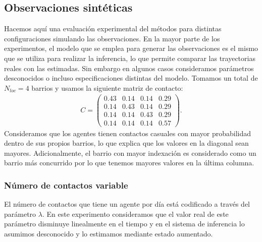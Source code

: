 \subsection{Observaciones sintéticas}

Hacemos aquí una evaluación experimental del métodos para distintas configuraciones simulando las observaciones. En la mayor parte de los experimentos, el modelo que se emplea para generar las observaciones es el mismo que se utiliza para realizar la inferencia, lo que permite comparar las trayectorias reales con las estimadas. Sin embargo en algunos casos consideramos parámetros desconocidos o incluso especificaciones distintas del modelo. Tomamos un total de $N_{loc} = 4$ barrios y usamos la siguiente matriz de contacto:
\begin{align*}
    C = 
    \begin{pmatrix}
        0.43 & 0.14 & 0.14 & 0.29 \\
        0.14 & 0.43 & 0.14 & 0.29 \\
        0.14 & 0.14 & 0.43 & 0.29 \\
        0.14 & 0.14 & 0.14 & 0.57 
    \end{pmatrix}.
\end{align*}
Consideramos que los agentes tienen contactos casuales con mayor probabilidad dentro de sus propios barrios, lo que explica que los valores en la diagonal sean mayores. Adicionalmente, el barrio con mayor indexación es considerado como un barrio más concurrido por lo que tenemos mayores valores en la última columna.

\subsubsection{Número de contactos variable}

El número de contactos que tiene un agente por día está codificado a través del parámetro $\lambda$. En este experimento consideramos que el valor real de este parámetro disminuye linealmente en el tiempo y en el sistema de inferencia lo asumimos desconocido y lo estimamos mediante estado aumentado.


